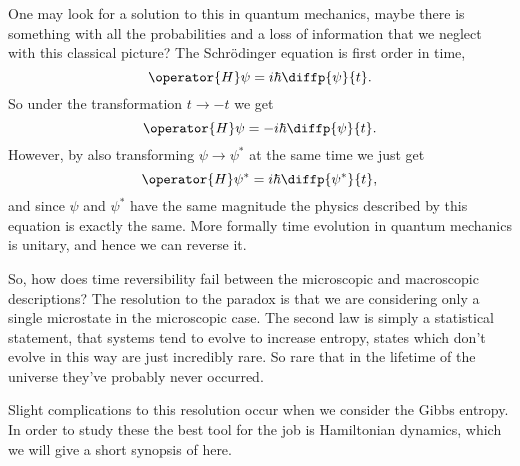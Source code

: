 \documentclass[fleqn]{NotesClass}
\begin{document}
    One may look for a solution to this in quantum mechanics, maybe there is something with all the probabilities and a loss of information that we neglect with this classical picture?
    The Schrödinger equation is first order in time,
    \begin{equation}
        \operator{H}\psi = i\hbar\diffp{\psi}{t}.
    \end{equation}
    So under the transformation \(t \to -t\) we get
    \begin{equation}
        \operator{H}\psi = -i\hbar\diffp{\psi}{t}.
    \end{equation}
    However, by also transforming \(\psi \to \psi^*\) at the same time we just get
    \begin{equation}
        \operator{H}\psi^* = i\hbar\diffp{\psi^*}{t},
    \end{equation}
    and since \(\psi\) and \(\psi^*\) have the same magnitude the physics described by this equation is exactly the same.
    More formally time evolution in quantum mechanics is unitary, and hence we can reverse it.
    
    So, how does time reversibility fail between the microscopic and macroscopic descriptions?
    The resolution to the paradox is that we are considering only a single microstate in the microscopic case.
    The second law is simply a statistical statement, that systems tend to evolve to increase entropy, states which don't evolve in this way are just incredibly rare.
    So rare that in the lifetime of the universe they've probably never occurred.
    
    Slight complications to this resolution occur when we consider the Gibbs entropy.
    In order to study these the best tool for the job is Hamiltonian dynamics, which we will give a short synopsis of here.
    
\end{document}
